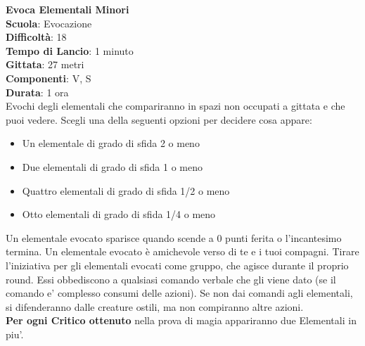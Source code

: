 \begin{multicols}{2}
\medskip\textbf{Evoca Elementali Minori}\\
\textbf{Scuola}: Evocazione\\
\textbf{Difficoltà}: 18\\
\textbf{Tempo di Lancio}: 1 minuto\\
\textbf{Gittata}: 27 metri\\
\textbf{Componenti}: V, S\\
\textbf{Durata}: 1 ora\\
Evochi degli elementali che compariranno in spazi non occupati a gittata e che puoi vedere. Scegli una della seguenti opzioni per decidere cosa appare:
\begin{itemize}
\item Un elementale di grado di sfida 2 o meno
\item Due elementali di grado di sfida 1 o meno
\item Quattro elementali di grado di sfida 1/2 o meno
\item Otto elementali di grado di sfida 1/4 o meno
\end{itemize}
\medskip
Un elementale evocato sparisce quando scende a 0 punti ferita o l'incantesimo termina. Un elementale evocato è amichevole verso di te e i tuoi compagni. Tirare l'iniziativa per gli elementali evocati come gruppo, che agisce durante il proprio round. Essi obbediscono a qualsiasi comando verbale che gli viene dato (se il comando e' complesso consumi delle azioni). Se non dai comandi agli elementali, si difenderanno dalle creature ostili, ma non compiranno altre azioni.\\
\textbf{Per ogni Critico ottenuto} nella prova di magia appariranno due Elementali in piu'.


\end{multicols}
